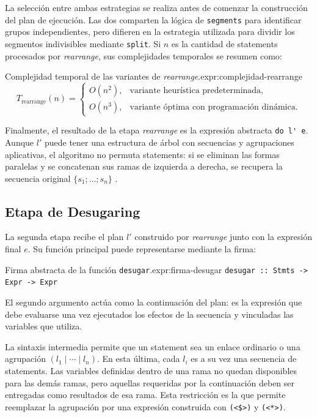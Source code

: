 La selección entre ambas estrategias se realiza antes de comenzar la construcción del plan de ejecución. Las dos comparten la lógica de \texttt{segments} para identificar grupos independientes, pero difieren en la estrategia utilizada para dividir los segmentos indivisibles mediante \texttt{split}. Si $n$ es la cantidad de statements procesados por \textit{rearrange}, sus complejidades temporales se resumen como:

\begin{ReportExpression}{Complejidad temporal de las variantes de \textit{rearrange}.}{expr:complejidad-rearrange}
\[
T_{\mathrm{rearrange}}(n)=
\begin{cases}
O(n^2), & \text{variante heurística predeterminada},\\
O(n^3), & \text{variante óptima con programación dinámica}.
\end{cases}
\]
\end{ReportExpression}

Finalmente, el resultado de la etapa \textit{rearrange} es la expresión abstracta \verb|do l' e|. Aunque $l'$ puede tener una estructura de árbol con secuencias y agrupaciones aplicativas, el algoritmo no permuta statements: si se eliminan las formas paralelas y se concatenan sus ramas de izquierda a derecha, se recupera la secuencia original $\{s_1;\ldots;s_n\}$ \cite[p.~95]{MarlowPJKM2016}.

\subsection{Etapa de Desugaring}
\label{sec:applicative-do-desugaring}

La segunda etapa recibe el plan $l'$ construido por \textit{rearrange} junto con la expresión final $e$. Su función principal puede representarse mediante la firma:

\begin{ReportExpression}{Firma abstracta de la función \texttt{desugar}.}{expr:firma-desugar}
\verb|desugar :: Stmts -> Expr -> Expr|
\end{ReportExpression}

El segundo argumento actúa como la continuación del plan: es la expresión que debe evaluarse una vez ejecutados los efectos de la secuencia y vinculadas las variables que utiliza.

La sintaxis intermedia permite que un statement sea un enlace ordinario o una agrupación $(l_1\mid\cdots\mid l_n)$. En esta última, cada $l_i$ es a su vez una secuencia de statements. Las variables definidas dentro de una rama no quedan disponibles para las demás ramas, pero aquellas requeridas por la continuación deben ser entregadas como resultados de esa rama. Esta restricción es la que permite reemplazar la agrupación por una expresión construida con \verb|(<$>)| y \verb|(<*>)|.

